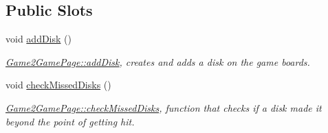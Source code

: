 \subsection*{Public Slots}
\begin{DoxyCompactItemize}
\item 
\mbox{\label{classGame2GamePage_a17a93aeabdf272879dd814b0381bfca8}} 
void \hyperlink{classGame2GamePage_a17a93aeabdf272879dd814b0381bfca8}{add\+Disk} ()
\begin{DoxyCompactList}\small\item\em \hyperlink{classGame2GamePage_a17a93aeabdf272879dd814b0381bfca8}{Game2\+Game\+Page\+::add\+Disk}, creates and adds a disk on the game boards. \end{DoxyCompactList}\item 
\mbox{\label{classGame2GamePage_a7f2480ad602fe9e6f4e13f7bd86a8fe5}} 
void \hyperlink{classGame2GamePage_a7f2480ad602fe9e6f4e13f7bd86a8fe5}{check\+Missed\+Disks} ()
\begin{DoxyCompactList}\small\item\em \hyperlink{classGame2GamePage_a7f2480ad602fe9e6f4e13f7bd86a8fe5}{Game2\+Game\+Page\+::check\+Missed\+Disks}, function that checks if a disk made it beyond the point of getting hit. \end{DoxyCompactList}\end{DoxyCompactItemize}
